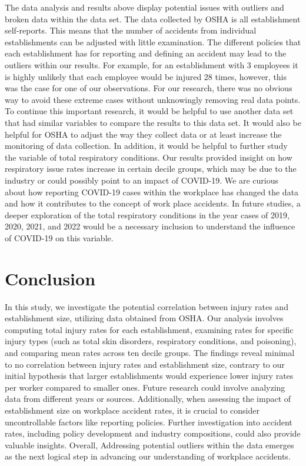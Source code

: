 \documentclass[12pt]{article}
\begin{document}
 The data analysis and results above display potential issues with outliers and broken data within the data set. The data collected by OSHA is all establishment self-reports. This means that the number of accidents from individual establishments can be adjusted with little examination. The different policies that each establishment has for reporting and defining an accident may lead to the outliers within our results. For example, for an establishment with 3 employees it is highly unlikely that each employee would be injured 28 times, however, this was the case for one of our observations. For our research, there was no obvious way to avoid these extreme cases without unknowingly removing real data points. To continue this important research, it would be helpful to use another data set that had similar variables to compare the results to this data set. It would also be helpful for OSHA to adjust the way they collect data or at least increase the monitoring of data collection. In addition, it would be helpful to further study the variable of total respiratory conditions. Our results provided insight on how respiratory issue rates increase in certain decile groups, which may be due to the industry or could possibly point to an impact of COVID-19. We are curious about how reporting COVID-19 cases within the workplace has changed the data and how it contributes to the concept of work place accidents. In future studies, a deeper exploration of the total respiratory conditions in the year cases of 2019, 2020, 2021, and 2022 would be a necessary inclusion to understand the influence of COVID-19 on this variable. 


\section{Conclusion}
\label{sec:conclusion}

In this study, we investigate the potential correlation between injury rates and establishment size, utilizing data obtained from OSHA. Our analysis involves computing total injury rates for each establishment, examining rates for specific injury types (such as total skin disorders, respiratory conditions, and poisoning), and comparing mean rates across ten decile groups. The findings reveal minimal to no correlation between injury rates and establishment size, contrary to our initial hypothesis that larger establishments would experience lower injury rates per worker compared to smaller ones.  Future research could involve analyzing data from different years or sources. Additionally, when assessing the impact of establishment size on workplace accident rates, it is crucial to consider uncontrollable factors like reporting policies. Further investigation into  accident rates, including policy development and industry compositions, could also provide valuable insights. Overall, Addressing potential outliers within the data emerges as the next logical step in advancing our understanding of workplace accidents.
\end{document}
